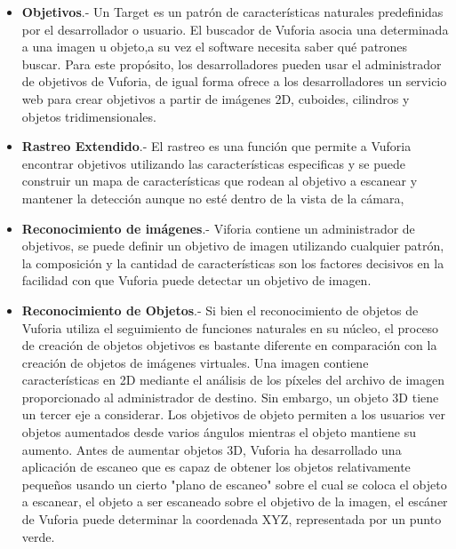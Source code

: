 	
	\begin{itemize}
	
	\item \textbf{Objetivos}.- Un Target es un patrón de características naturales predefinidas por el desarrollador o usuario. El buscador de  Vuforia asocia una determinada a una imagen u objeto,a  su vez el software necesita saber qué patrones buscar. Para este propósito, los desarrolladores pueden usar el administrador de objetivos de Vuforia, de igual forma ofrece a los desarrolladores un servicio web para crear objetivos a partir de imágenes 2D, cuboides, cilindros y objetos tridimensionales.
	
	\item \textbf{Rastreo Extendido}.- El rastreo es una función que permite a Vuforia encontrar objetivos utilizando las características especificas y se  puede construir un mapa de características que rodean al objetivo a escanear y mantener la detección aunque no esté dentro de la vista de la cámara, 
	
	\item \textbf{Reconocimiento de imágenes}.- Viforia contiene un administrador de objetivos, se puede definir un objetivo de imagen utilizando cualquier patrón, la composición y la cantidad de características son los factores decisivos en la facilidad con que Vuforia puede detectar un objetivo de imagen.
	
	\item \textbf{Reconocimiento de Objetos}.- Si bien el reconocimiento de objetos de Vuforia utiliza el seguimiento de funciones naturales en su núcleo, el proceso de creación de objetos objetivos es bastante diferente en comparación con la creación de objetos de imágenes virtuales. Una imagen contiene características en 2D mediante el análisis de los píxeles del archivo de imagen proporcionado al administrador de destino. Sin embargo, un objeto 3D tiene un tercer eje a considerar. Los objetivos de objeto permiten a los usuarios ver objetos aumentados desde varios ángulos mientras el objeto mantiene su aumento. Antes de aumentar objetos 3D, Vuforia ha desarrollado una aplicación de escaneo que es capaz de obtener los objetos relativamente pequeños usando un cierto "plano de escaneo" sobre el cual se coloca el objeto a escanear, el objeto a ser escaneado sobre el objetivo de la imagen, el escáner de Vuforia puede determinar la coordenada XYZ, representada por un punto verde.
		
\end{itemize}
\noindent
